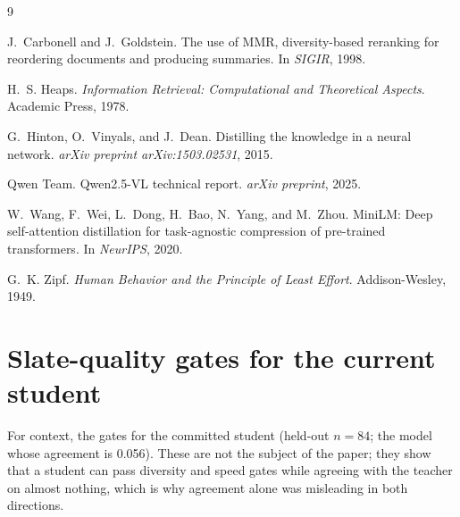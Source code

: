 \begin{thebibliography}{9}

J.~Carbonell and J.~Goldstein.
\newblock The use of MMR, diversity-based reranking for reordering documents and
producing summaries.
\newblock In \emph{SIGIR}, 1998.

H.~S. Heaps.
\newblock \emph{Information Retrieval: Computational and Theoretical Aspects}.
\newblock Academic Press, 1978.

G.~Hinton, O.~Vinyals, and J.~Dean.
\newblock Distilling the knowledge in a neural network.
\newblock \emph{arXiv preprint arXiv:1503.02531}, 2015.

Qwen Team.
\newblock Qwen2.5-VL technical report.
\newblock \emph{arXiv preprint}, 2025.

W.~Wang, F.~Wei, L.~Dong, H.~Bao, N.~Yang, and M.~Zhou.
\newblock MiniLM: Deep self-attention distillation for task-agnostic compression
of pre-trained transformers.
\newblock In \emph{NeurIPS}, 2020.

G.~K. Zipf.
\newblock \emph{Human Behavior and the Principle of Least Effort}.
\newblock Addison-Wesley, 1949.

\end{thebibliography}

\appendix
\section{Slate-quality gates for the current student}
\label{app:gates}
For context, the gates for the committed student (held-out $n=84$; the model
whose agreement is 0.056). These are not the subject of the paper; they show
that a student can pass diversity and speed gates while agreeing with the
teacher on almost nothing, which is why agreement alone was misleading in both
directions.


